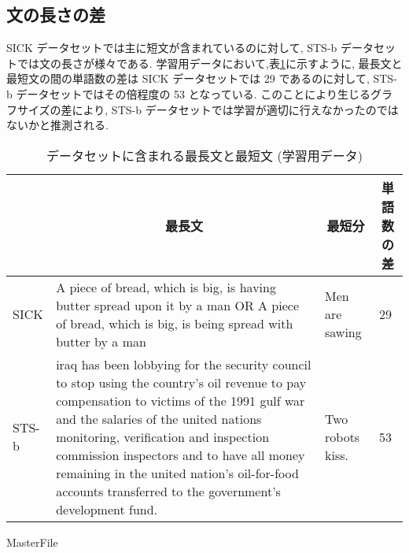 \documentclass[a4j,twoside,12pt]{thesis} %
\begin{document}
\subsection{文の長さの差}
SICK データセットでは主に短文が含まれているのに対して, STS-b データセットでは文の長さが様々である.
学習用データにおいて,表\ref{table:len}に示すように, 最長文と最短文の間の単語数の差は SICK データセットでは 29 であるのに対して, STS-b データセットではその倍程度の 53 となっている.
このことにより生じるグラフサイズの差により, STS-b データセットでは学習が適切に行えなかったのではないかと推測される.
\begin{table}
  \caption{データセットに含まれる最長文と最短文 (学習用データ)}
  \label{table:len}
  \begin{center}
  \begin{tabularx}{\linewidth}{l||X|X|X}
    \hline
          & \multicolumn{1}{c|}{最長文} & \multicolumn{1}{c|}{最短分} & \multicolumn{1}{c}{単語数の差} \\
    \hline
    \hline
    SICK &
    A piece of bread, which is big, is having butter spread upon it by a man OR A piece of bread, which is big, is being spread with butter by a man &
    Men are sawing &
    29 \\

    \hline
    STS-b &
    iraq has been lobbying for the security council to stop using the country's oil revenue to pay compensation to victims of the 1991 gulf war and the salaries of the united nations monitoring, verification and inspection commission inspectors and to have all money remaining in the united nation's oil-for-food accounts transferred to the government's development fund. &
    Two robots kiss. &
    53 \\
    \hline

  \end{tabularx}
  \end{center}
\end{table}

\expandafter\ifx\csname MasterFile\endcsname\relax
\def\MasterFile{本原稿です}

% 


\end{document}
